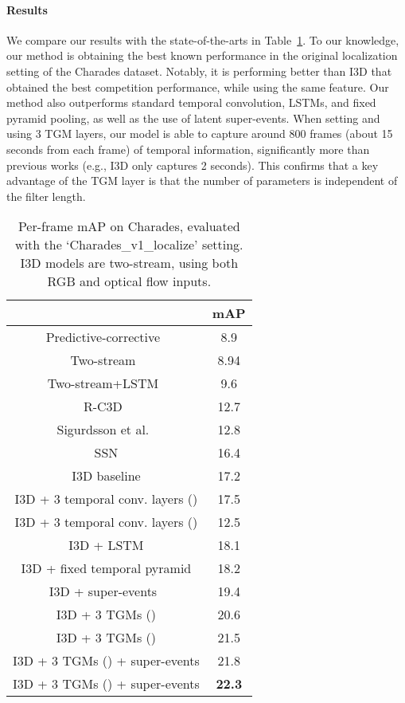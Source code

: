 \documentclass{article}
\begin{document}
\paragraph{Results}
We compare our results with the state-of-the-arts in Table~\ref{tab:charades-comp}. To our knowledge, our method is obtaining the best known performance in the original localization setting of the Charades dataset. Notably, it is performing better than I3D that obtained the best competition performance, while using the same feature. Our method also outperforms standard temporal convolution, LSTMs, and fixed pyramid pooling, as well as the use of latent super-events.
When setting  and using 3 TGM layers, our model is able to capture around 800 frames (about 15 seconds from each frame) of temporal information, significantly more than previous works (e.g., I3D only captures 2 seconds). This confirms that a key advantage of the TGM layer is that the number of parameters is independent of the filter length.

\begin{table}
\caption{Per-frame mAP on Charades, evaluated with the `Charades\_v1\_localize' setting. I3D models are two-stream, using both RGB and optical flow inputs.} \label{tab:charades-comp}
\centering
\setlength\extrarowheight{0pt}
\begin{tabular}{c|c}
\toprule
 & mAP \\
\midrule
Predictive-corrective~\citep{dave2017predictive} & 8.9 \\
Two-stream~\citep{sigurdsson2016asynchronous}& 8.94 \\
Two-stream+LSTM~\citep{sigurdsson2016asynchronous}& 9.6 \\
R-C3D~\citep{xu2017r}                         &  12.7 \\
Sigurdsson et al.~\citep{sigurdsson2016asynchronous} & 12.8 \\
SSN \cite{zhao2017temporal} & 16.4 \\
I3D baseline                                 & 17.2 \\
I3D + 3 temporal conv. layers ()                 &  17.5   \\
I3D + 3 temporal conv. layers ()                 &  12.5   \\
I3D + LSTM                                   & 18.1 \\
I3D + fixed temporal pyramid                & 18.2 \\
I3D + super-events~\citep{piergiovanni2018super}                   & 19.4 \\
I3D + 3 TGMs ()                         & 20.6  \\
I3D + 3 TGMs ()                          & 21.5  \\
I3D + 3 TGMs ()  + super-events                     & 21.8  \\
I3D + 3 TGMs () + super-events                     & \bf{22.3}  \\
\bottomrule
\end{tabular}
\end{table}
\end{document}
